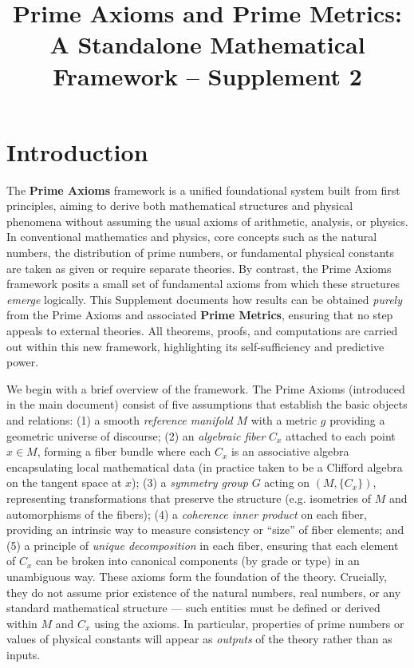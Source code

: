 \documentclass[11pt]{article}
\begin{document}
\title{Prime Axioms and Prime Metrics:\\ A Standalone Mathematical Framework -- Supplement 2}
\author{}
\date{}
\maketitle

\section{Introduction}

The \textbf{Prime Axioms} framework is a unified foundational system built from first principles, aiming to derive both mathematical structures and physical phenomena without assuming the usual axioms of arithmetic, analysis, or physics. In conventional mathematics and physics, core concepts such as the natural numbers, the distribution of prime numbers, or fundamental physical constants are taken as given or require separate theories. By contrast, the Prime Axioms framework posits a small set of fundamental axioms from which these structures \emph{emerge} logically. This Supplement documents how results can be obtained \emph{purely} from the Prime Axioms and associated \textbf{Prime Metrics}, ensuring that no step appeals to external theories. All theorems, proofs, and computations are carried out within this new framework, highlighting its self-sufficiency and predictive power.

We begin with a brief overview of the framework. The Prime Axioms (introduced in the main document) consist of five assumptions that establish the basic objects and relations: (1) a smooth \emph{reference manifold} $M$ with a metric $g$ providing a geometric universe of discourse; (2) an \emph{algebraic fiber} $C_x$ attached to each point $x\in M$, forming a fiber bundle where each $C_x$ is an associative algebra encapsulating local mathematical data (in practice taken to be a Clifford algebra on the tangent space at $x$); (3) a \emph{symmetry group} $G$ acting on $(M,\{C_x\})$, representing transformations that preserve the structure (e.g. isometries of $M$ and automorphisms of the fibers); (4) a \emph{coherence inner product} on each fiber, providing an intrinsic way to measure consistency or “size” of fiber elements; and (5) a principle of \emph{unique decomposition} in each fiber, ensuring that each element of $C_x$ can be broken into canonical components (by grade or type) in an unambiguous way. These axioms form the foundation of the theory. Crucially, they do not assume prior existence of the natural numbers, real numbers, or any standard mathematical structure --- such entities must be defined or derived within $M$ and $C_x$ using the axioms. In particular, properties of prime numbers or values of physical constants will appear as \emph{outputs} of the theory rather than as inputs.
\end{document}
